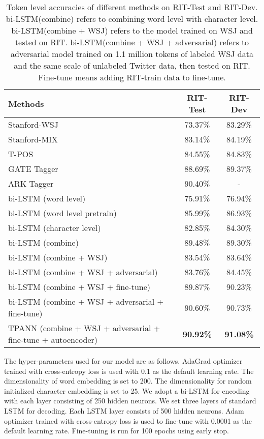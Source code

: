 \documentclass[11pt,letterpaper]{article}
\begin{document}
\begin{table*}
\centering
\begin{tabular}{lcc}
  \textbf{Methods} & \textbf{RIT-Test} & \textbf{RIT-Dev}\\
  \hline
  Stanford-WSJ~\cite{toutanova2003feature} & 73.37\% & 83.29\% \\
  Stanford-MIX & 83.14\% & 84.19\% \\
  T-POS~\cite{ritter2011named}  & 84.55\% & 84.83\% \\
  GATE Tagger~\cite{derczynski2013twitter} & 88.69\% & 89.37\% \\
  ARK Tagger~\cite{owoputi2013improved} & 90.40\% & - \\
  \hline
  bi-LSTM (word level) & 75.91\% & 76.94\% \\
  bi-LSTM (word level pretrain) & 85.99\% & 86.93\% \\
  bi-LSTM (character level)  & 82.85\% & 84.30\% \\
  bi-LSTM (combine)  & 89.48\% & 89.30\% \\
  \hline
  bi-LSTM (combine + WSJ) & 83.54\% & 83.64\% \\
  bi-LSTM (combine + WSJ + adversarial) & 83.76\% & 84.45\% \\
  bi-LSTM (combine + WSJ + fine-tune) & 89.87\% & 90.23\% \\  
  bi-LSTM (combine + WSJ + adversarial + fine-tune)& 90.60\% & 90.73\% \\
  TPANN (combine + WSJ + adversarial + fine-tune + autoencoder) & \textbf{90.92\%} & \textbf{91.08\%} \\
  \hline
\end{tabular}
\caption{Token level accuracies of different methods on RIT-Test and RIT-Dev. bi-LSTM(combine) refers to combining word level with character level. bi-LSTM(combine + WSJ) refers to the model trained on WSJ and tested on RIT. bi-LSTM(combine + WSJ + adversarial) refers to adversarial model trained on 1.1 million tokens of labeled WSJ data and the same scale of unlabeled Twitter data, then tested on RIT. Fine-tune means adding RIT-train data to fine-tune.}


  \label{tb:ritterresult}
\end{table*}


The hyper-parameters used for our model are as follows. AdaGrad optimizer trained with cross-entropy loss is used with 0.1 as the default learning rate. The dimensionality of word embedding is set to 200. The dimensionality for random initialized character embedding is set to 25.
We adopt a bi-LSTM for encoding with each layer consisting of 250 hidden neurons. We set three layers of standard LSTM for decoding. Each LSTM layer consists of 500 hidden neurons. Adam optimizer trained with cross-entropy loss is used to fine-tune with 0.0001 as the default learning rate. Fine-tuning is run for 100 epochs using early stop.
\end{document}
